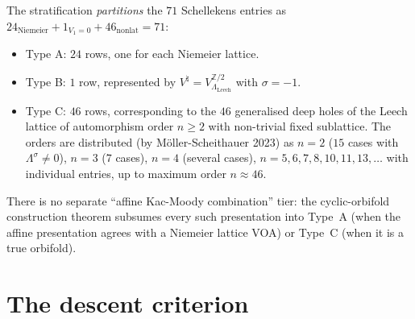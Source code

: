 \begin{remark}
\label{rem:schellekens-strata-counts}
The stratification \emph{partitions} the $71$ Schellekens entries as
$24_{\mathrm{Niemeier}} + 1_{V_1=0} + 46_{\mathrm{nonlat}} = 71$:
\begin{itemize}
\item Type A: $24$ rows, one for each Niemeier lattice.
\item Type B: $1$ row, represented by
$V^\natural = V_{\Lambda_{\mathrm{Leech}}}^{\mathbb{Z}/2}$ with
$\sigma = -1$.
\item Type C: $46$ rows, corresponding to the $46$ generalised deep
holes of the Leech lattice of automorphism order $n \ge 2$ with
non-trivial fixed sublattice. The orders are distributed (by
M\"oller-Scheithauer 2023) as $n = 2$ ($15$ cases with
$\Lambda^\sigma \ne 0$), $n = 3$ ($7$ cases), $n = 4$ (several cases),
$n = 5, 6, 7, 8, 10, 11, 13, \ldots$ with individual entries, up to
maximum order $n \approx 46$.
\end{itemize}
There is no separate ``affine Kac-Moody combination'' tier: the
cyclic-orbifold construction theorem subsumes every such presentation into
Type~A (when the affine presentation agrees with a Niemeier lattice
VOA) or Type~C (when it is a true orbifold).
\end{remark}

\section{The descent criterion}
\label{sec:schellekens-71-main}


